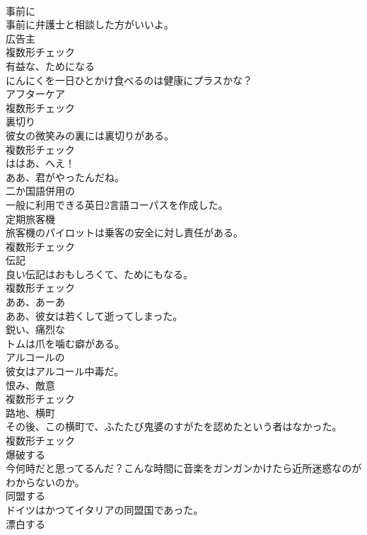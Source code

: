 \documentclass[8pt]{extreport}
\begin{document}
\begin{CJK}{UTF8}{min}
\\	[副詞]	事前に	
\\	事前に弁護士と相談した方がいいよ。	
\\	[名詞]	広告主	
\\	複数形チェック
\\	[形容詞]	有益な、ためになる	
\\	にんにくを一日ひとかけ食べるのは健康にプラスかな？	
\\	[名詞]	アフターケア	
\\	複数形チェック
\\	[名詞]	裏切り	
\\	彼女の微笑みの裏には裏切りがある。	
\\	複数形チェック
\\	[感動詞]	ははあ、へえ！	
\\	ああ、君がやったんだね。	
\\	[形容詞]	二か国語併用の	
\\	一般に利用できる英日2言語コーパスを作成した。	
\\	[名詞]	定期旅客機	
\\	旅客機のパイロットは乗客の安全に対し責任がある。	
\\	複数形チェック
\\	[名詞]	伝記	
\\	良い伝記はおもしろくて、ためにもなる。	
\\	複数形チェック
\\	[感動詞]	ああ、あーあ	
\\	ああ、彼女は若くして逝ってしまった。	
\\	[形容詞]	鋭い、痛烈な	
\\	トムは爪を噛む癖がある。	
\\	[形容詞]	アルコールの	
\\	彼女はアルコール中毒だ。	
\\	[名詞]	恨み、敵意	
\\	複数形チェック
\\	[名詞]	路地、横町	
\\	その後、この横町で、ふたたび鬼婆のすがたを認めたという者はなかった。	
\\	複数形チェック
\\	[動詞]	爆破する	
\\	今何時だと思ってるんだ？こんな時間に音楽をガンガンかけたら近所迷惑なのがわからないのか。	
\\	[動詞]	同盟する	
\\	ドイツはかつてイタリアの同盟国であった。	
\\	[動詞]	漂白する	

\end{CJK}
\end{document}
